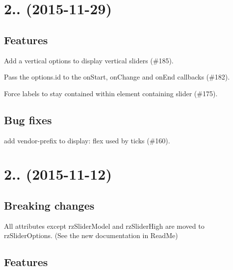 \section*{2.. (2015-\/11-\/29)}

\subsection*{Features}


\begin{DoxyItemize}
\item Add a {\ttfamily vertical} options to display vertical sliders (\#185).
\item Pass the options.\+id to the on\+Start, on\+Change and on\+End callbacks (\#182).
\item Force labels to stay contained within element containing slider (\#175).
\end{DoxyItemize}

\subsection*{Bug fixes}


\begin{DoxyItemize}
\item add vendor-\/prefix to {\ttfamily display\+: flex} used by ticks (\#160).
\end{DoxyItemize}

\section*{2.. (2015-\/11-\/12)}

\subsection*{Breaking changes}


\begin{DoxyItemize}
\item All attributes except {\ttfamily rz\+Slider\+Model} and {\ttfamily rz\+Slider\+High} are moved to {\ttfamily rz\+Slider\+Options}. (See the new documentation in Read\+Me)
\end{DoxyItemize}

\subsection*{Features}


